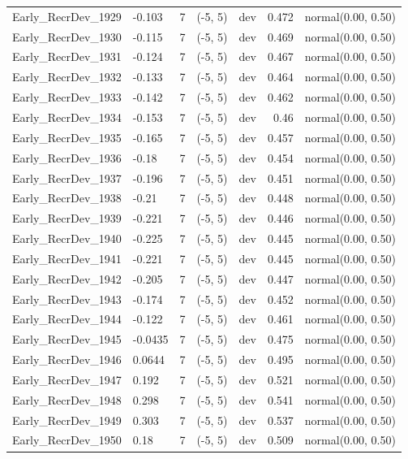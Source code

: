 \documentclass[
  english,
]{article}
\begin{document}
\begin{landscape}
\begin{longtable}{llrllrl}
Early\_RecrDev\_1929 & -0.103 & 7 & (-5, 5) & dev & 0.472 & normal(0.00, 0.50) \\ 
Early\_RecrDev\_1930 & -0.115 & 7 & (-5, 5) & dev & 0.469 & normal(0.00, 0.50) \\ 
Early\_RecrDev\_1931 & -0.124 & 7 & (-5, 5) & dev & 0.467 & normal(0.00, 0.50) \\ 
Early\_RecrDev\_1932 & -0.133 & 7 & (-5, 5) & dev & 0.464 & normal(0.00, 0.50) \\ 
Early\_RecrDev\_1933 & -0.142 & 7 & (-5, 5) & dev & 0.462 & normal(0.00, 0.50) \\ 
Early\_RecrDev\_1934 & -0.153 & 7 & (-5, 5) & dev & 0.46 & normal(0.00, 0.50) \\ 
Early\_RecrDev\_1935 & -0.165 & 7 & (-5, 5) & dev & 0.457 & normal(0.00, 0.50) \\ 
Early\_RecrDev\_1936 & -0.18 & 7 & (-5, 5) & dev & 0.454 & normal(0.00, 0.50) \\ 
Early\_RecrDev\_1937 & -0.196 & 7 & (-5, 5) & dev & 0.451 & normal(0.00, 0.50) \\ 
Early\_RecrDev\_1938 & -0.21 & 7 & (-5, 5) & dev & 0.448 & normal(0.00, 0.50) \\ 
Early\_RecrDev\_1939 & -0.221 & 7 & (-5, 5) & dev & 0.446 & normal(0.00, 0.50) \\ 
Early\_RecrDev\_1940 & -0.225 & 7 & (-5, 5) & dev & 0.445 & normal(0.00, 0.50) \\ 
Early\_RecrDev\_1941 & -0.221 & 7 & (-5, 5) & dev & 0.445 & normal(0.00, 0.50) \\ 
Early\_RecrDev\_1942 & -0.205 & 7 & (-5, 5) & dev & 0.447 & normal(0.00, 0.50) \\ 
Early\_RecrDev\_1943 & -0.174 & 7 & (-5, 5) & dev & 0.452 & normal(0.00, 0.50) \\ 
Early\_RecrDev\_1944 & -0.122 & 7 & (-5, 5) & dev & 0.461 & normal(0.00, 0.50) \\ 
Early\_RecrDev\_1945 & -0.0435 & 7 & (-5, 5) & dev & 0.475 & normal(0.00, 0.50) \\ 
Early\_RecrDev\_1946 & 0.0644 & 7 & (-5, 5) & dev & 0.495 & normal(0.00, 0.50) \\ 
Early\_RecrDev\_1947 & 0.192 & 7 & (-5, 5) & dev & 0.521 & normal(0.00, 0.50) \\ 
Early\_RecrDev\_1948 & 0.298 & 7 & (-5, 5) & dev & 0.541 & normal(0.00, 0.50) \\ 
Early\_RecrDev\_1949 & 0.303 & 7 & (-5, 5) & dev & 0.537 & normal(0.00, 0.50) \\ 
Early\_RecrDev\_1950 & 0.18 & 7 & (-5, 5) & dev & 0.509 & normal(0.00, 0.50) \\ 

\end{longtable}
\end{landscape}
\end{document}

